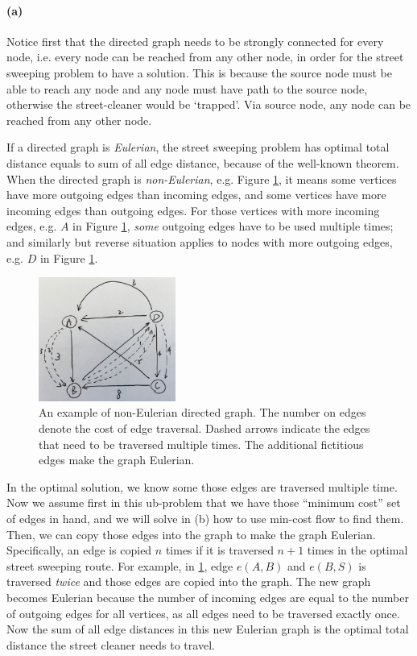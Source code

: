 \documentclass[12pt]{article}
\begin{document}
\paragraph{(a)} Notice first that the directed graph needs to be strongly connected for every node, i.e. every node can be reached from any other node, in order for the street sweeping problem to have a solution. This is because the source node must be able to reach any node and any node must have path to the source node, otherwise the street-cleaner would be `trapped'. Via source node, any node can be reached from any other node.

If a directed graph is \emph{Eulerian}, the street sweeping problem has optimal total distance equals to sum of all edge distance, because of the well-known theorem. When the directed graph is \emph{non-Eulerian}, e.g. Figure \ref{fig:5-a}, it means some vertices have more outgoing edges than incoming edges, and some vertices have more incoming edges than outgoing edges. For those vertices with more incoming edges, e.g. $A$ in Figure \ref{fig:5-a}, \emph{some} outgoing edges have to be used multiple times; and similarly but reverse situation applies to nodes with more outgoing edges, e.g. $D$ in Figure \ref{fig:5-a}.
\begin{figure}[h!]
	\centering
	\includegraphics[width=0.4\textwidth]{5-a.jpg}
	\caption{An example of non-Eulerian directed graph. The number on edges denote the cost of edge traversal. Dashed arrows indicate the edges that need to be traversed multiple times. The additional fictitious edges make the graph Eulerian.} \label{fig:5-a}
\end{figure}

In the optimal solution, we know some those edges are traversed multiple time. Now we assume first in this ub-problem that we have those ``minimum cost'' set of edges in hand, and we will solve in (b) how to use min-cost flow to find them. Then, we can copy those edges into the graph to make the graph Eulerian. Specifically, an edge is copied $n$ times if it is traversed $n+1$ times in the optimal street sweeping route. For example, in \ref{fig:5-a}, edge $e(A,B)$ and $e(B,S)$ is traversed \emph{twice} and those edges are copied into the graph. The new graph becomes Eulerian because the number of incoming edges are equal to the number of outgoing edges for all vertices, as all edges need to be traversed exactly once. Now the sum of all edge distances in this new Eulerian graph is the optimal total distance the street cleaner needs to travel.
\end{document}
